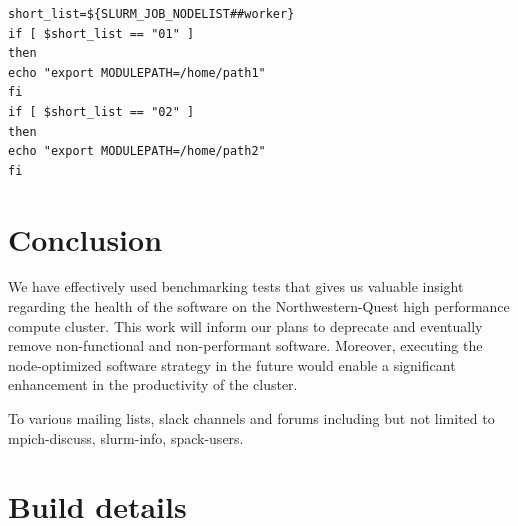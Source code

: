 \documentclass[sigconf,authordraft]{acmart}
\begin{document}
\begin{verbatim}
short_list=${SLURM_JOB_NODELIST##worker}
if [ $short_list == "01" ]
then
echo "export MODULEPATH=/home/path1"
fi
if [ $short_list == "02" ]
then
echo "export MODULEPATH=/home/path2"
fi
\end{verbatim}


\section{Conclusion}

We have effectively used benchmarking tests that gives us valuable insight regarding the health of the software on the Northwestern-Quest high performance compute cluster. This work will inform our plans to deprecate and eventually remove non-functional and non-performant software. Moreover, executing the node-optimized software strategy in the future would enable a significant enhancement in the productivity of the cluster.

\begin{acks}
To various mailing lists, slack channels and forums including but not limited to mpich-discuss, slurm-info, spack-users.
\end{acks}




\appendix
\section{Build details}
\end{document}
